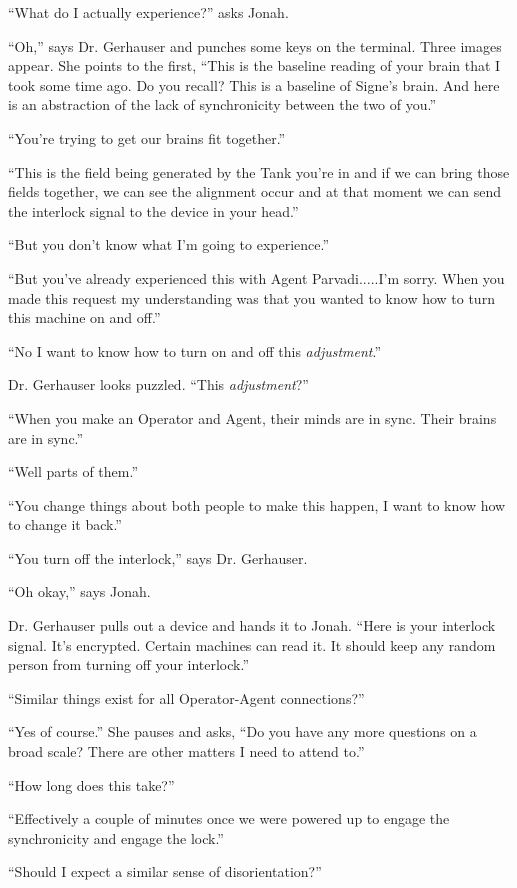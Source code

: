 ``What do I actually experience?'' asks Jonah.

``Oh,'' says Dr. Gerhauser and punches some keys on the terminal.  Three images appear.  She points to the first, ``This is the baseline reading of your brain that I took some time ago.  Do you recall?  This is a baseline of Signe's brain.  And here is an abstraction of the lack of synchronicity between the two of you.''

``You're trying to get our brains fit together.''

``This is the field being generated by the Tank you're in and if we can bring those fields together, we can see the alignment occur and at that moment we can send the interlock signal to the device in your head.''

``But you don't know what I'm going to experience.''

``But you've already experienced this with Agent Parvadi.....I'm sorry.  When you made this request my understanding was that you wanted to know how to turn this machine on and off.''

``No I want to know how to turn on and off this \textit{adjustment}.''

Dr. Gerhauser looks puzzled.  ``This \textit{adjustment}?''

``When you make an Operator and Agent, their minds are in sync.  Their brains are in sync.''

``Well parts of them.''

``You change things about both people to make this happen, I want to know how to change it back.''

``You turn off the interlock,'' says Dr. Gerhauser.  

``Oh okay,'' says Jonah.

Dr. Gerhauser pulls out a device and hands it to Jonah. ``Here is your interlock signal.  It's encrypted. Certain machines can read it.  It should keep any random person from turning off your interlock.''

``Similar things exist for all Operator-Agent connections?''

``Yes of course.''  She pauses and asks, ``Do you have any more questions on a broad scale?  There are other matters I need to attend to.''

``How long does this take?''

``Effectively a couple of minutes once we were powered up to engage the synchronicity and engage the lock.''

``Should I expect a similar sense of disorientation?''

